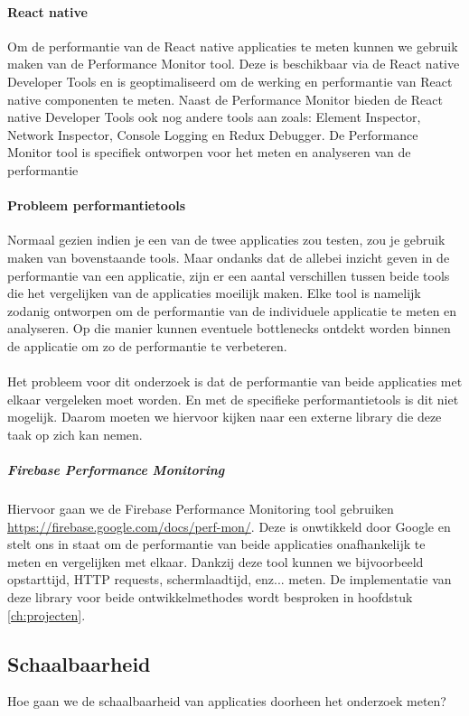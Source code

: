 \paragraph{React native}
Om de performantie van de React native applicaties te meten kunnen we gebruik maken van de Performance Monitor tool. 
Deze is beschikbaar via de React native Developer Tools en is geoptimaliseerd om de werking en performantie van React native 
componenten te meten. Naast de Performance Monitor bieden de React native Developer 
Tools ook nog andere tools aan zoals: Element Inspector, Network Inspector, Console Logging en Redux Debugger. De 
Performance Monitor tool is specifiek ontworpen voor het meten en analyseren van de performantie

\paragraph{Probleem performantietools}
Normaal gezien indien je een van de twee applicaties zou testen, zou je gebruik maken van bovenstaande tools.
Maar ondanks dat de allebei inzicht geven in de performantie van een applicatie, 
zijn er een aantal verschillen tussen beide tools die het vergelijken van de applicaties moeilijk maken. 
Elke tool is namelijk zodanig ontworpen om de performantie van de individuele applicatie te meten en analyseren.
Op die manier kunnen eventuele \gls{bottlenecks} ontdekt worden binnen de applicatie om zo de performantie te verbeteren.
\\\\
Het probleem voor dit onderzoek is dat de performantie van beide applicaties met elkaar vergeleken moet worden. 
En met de specifieke performantietools is dit niet mogelijk. Daarom moeten we hiervoor kijken naar een externe 
library die deze taak op zich kan nemen. 

\subparagraph{Firebase Performance Monitoring}
Hiervoor gaan we de Firebase Performance Monitoring tool gebruiken \url{https://firebase.google.com/docs/perf-mon/}. 
Deze is onwtikkeld door Google en stelt ons in staat om de performantie van beide applicaties onafhankelijk te meten en 
vergelijken met elkaar. Dankzij deze tool kunnen we bijvoorbeeld opstarttijd, HTTP requests, schermlaadtijd, enz... meten.
De implementatie van deze library voor beide ontwikkelmethodes wordt besproken in hoofdstuk \ref{ch:projecten}.

\subsection{Schaalbaarheid}
Hoe gaan we de schaalbaarheid van applicaties doorheen het onderzoek meten?

